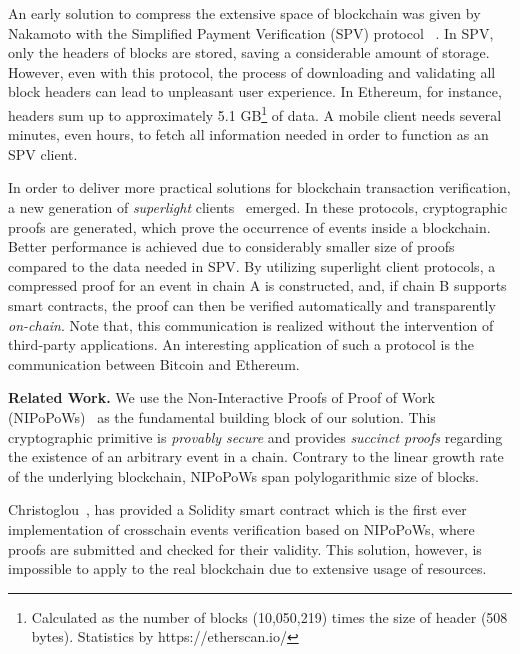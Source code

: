 An early solution to compress the extensive space of blockchain was given by
Nakamoto with the Simplified Payment Verification (SPV) protocol
~\cite{nakamoto}. In SPV, only the headers of blocks are stored, saving a
considerable amount of storage.  However, even with this protocol, the process
of downloading and validating all block headers can lead to unpleasant user
experience. In Ethereum, for instance, headers sum up to approximately 5.1
GB\footnote{Calculated as the number of blocks (10,050,219) times the size of
header (508 bytes). Statistics by https://etherscan.io/} of data. A mobile
client needs several minutes, even hours, to fetch all information needed in
order to function as an SPV client.

In order to deliver more practical solutions for blockchain transaction
verification, a new generation of \emph{superlight}
clients~\cite{popow,nipopows,compactsuperblocks, flyclient} emerged. In these
protocols, cryptographic proofs are generated, which prove the occurrence of
events inside a blockchain. Better performance is achieved due to considerably
smaller size of proofs compared to the data needed in SPV. By utilizing
superlight client protocols, a compressed proof for an event in chain A is
constructed, and, if chain B supports smart contracts, the proof can then be
verified automatically and transparently \emph{on-chain}.  Note that, this
communication is realized without the intervention of third-party applications.
An interesting application of such a protocol is the communication between
Bitcoin and Ethereum.

\noindent

\textbf{Related Work.} We use the Non-Interactive Proofs of Proof of Work
(NIPoPoWs)~\cite{nipopows, pow-sidechains} as the fundamental building block
of our solution. This cryptographic primitive is \emph{provably secure} and
provides \emph{succinct proofs} regarding the existence of an arbitrary event
in a chain. Contrary to the linear growth rate of the underlying blockchain,
NIPoPoWs span polylogarithmic size of blocks.

Christoglou~\cite{gglou}, has provided a Solidity smart contract which is the first
ever implementation of crosschain events verification based on NIPoPoWs, where
proofs are submitted and checked for their validity. This solution, however, is
impossible to apply to the real blockchain due to extensive usage of resources.

\noindent

